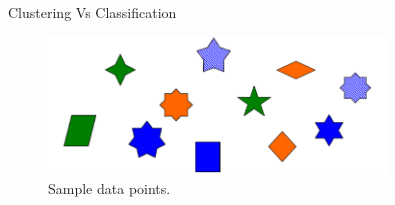 \begin{frame}[allowframebreaks]{Clustering Vs Classification}
\begin{figure}
    \centering
    \includegraphics[width=0.8\textwidth,keepaspectratio]{images/dul/sample-clustering-classification.png}
    \caption{Sample data points.}
\end{figure}

\framebreak


\end{frame}
